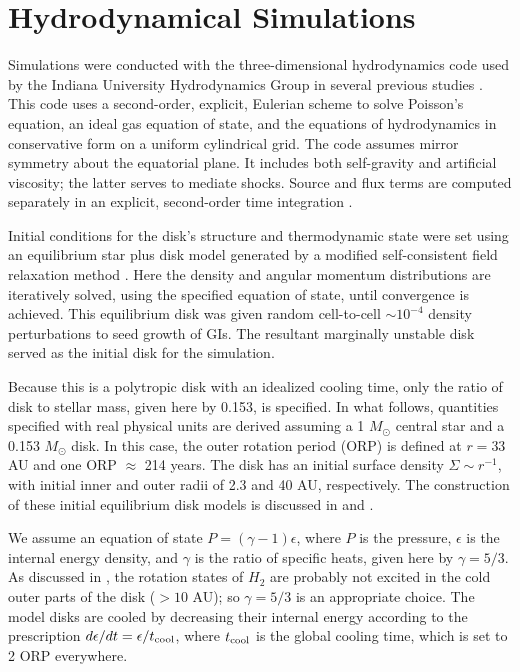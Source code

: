 \documentclass[manuscript]{aastex}
\begin{document}
\section{Hydrodynamical Simulations}

Simulations were conducted with the three-dimensional hydrodynamics code used by the Indiana University Hydrodynamics Group in several previous studies \citep{pickett1998, pickett2000, mejiaphd2004, mejia2005, boley2006, cai2008}.  This code uses a second-order, explicit, Eulerian scheme to solve Poisson's equation, an ideal gas equation of state, and the equations of hydrodynamics in conservative form on a uniform cylindrical grid.  The code assumes mirror symmetry about the equatorial plane. It includes both self-gravity and artificial viscosity; the latter serves to 
mediate shocks. Source and flux terms \citep{norman1986} are computed separately in an explicit, second-order time integration \citep{albada1982,christodoulou1991,yangphd1992}.

Initial conditions for the disk's structure and thermodynamic state were set using an equilibrium star plus disk model generated by a modified \citet{hachisu1986} self-consistent field relaxation method \citep{pickett1996,pickett2003,mejiaphd2004,mejia2005,cai2006}. Here  the density and angular momentum distributions are iteratively solved, using the specified equation of state,  until convergence is achieved. This  equilibrium disk was 
given random cell-to-cell $\sim10^{-4}$ density perturbations to seed growth of  GIs.  The resultant marginally unstable disk served as the initial disk for the simulation.

Because this is a polytropic disk with an idealized cooling time, only the ratio of disk to stellar mass, given here by
0.153, is specified.  In what follows, quantities specified with real physical units are derived assuming a 1 $M_\odot$
central star and a 0.153  $M_\odot$ disk. In this case, the outer rotation period (ORP) is defined at $r = 33$ AU and
one ORP $\approx$ 214 years.  The disk has an initial surface density $\Sigma \sim r^{ -1}$, with initial inner and
outer radii of 2.3 and 40 AU, respectively. The construction of these initial equilibrium disk models is discussed in
\citet{pickett2003} and \citet{mejia2005}.

 We assume an equation of state $P = (\gamma -1)\epsilon$, where $P$ is the pressure, $\epsilon$ is the internal energy
 density, and $\gamma$ is the ratio of specific heats, given here by $\gamma = 5/3$. As discussed in \citet{boley2007a},
 the rotation states of $H_2$ are probably not excited in the cold outer parts of the disk ($> 10$ AU); so $\gamma =
 5/3$ is an appropriate choice. The model disks are cooled by decreasing their internal energy according to the prescription $d\epsilon/dt = \epsilon / t_{\rm cool}$, where $t_{\rm cool}$ is the global cooling time, which is set to 2 ORP everywhere. 
 
\end{document}
